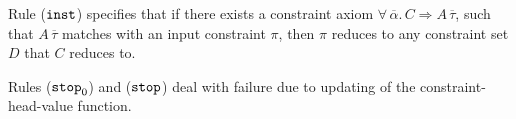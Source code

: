 Rule ($\texttt{inst}$) specifies that if there exists a constraint axiom
$\forall\,\overline{\alpha}.\,C \Rightarrow A\,\overline{\tau}$, such
that $A\,\overline{\tau}$ matches with an input constraint $\pi$, then
$\pi$ reduces to any constraint set $D$ that $C$ reduces to.

Rules ($\texttt{stop}_0$) and ($\texttt{stop}$) deal with failure due to updating
of the constraint-head-value function.
